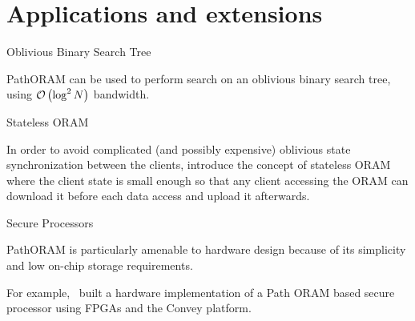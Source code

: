 
\section{Applications and extensions}

	\begin{frame}{Oblivious Binary Search Tree}
		
		PathORAM can be used to perform search on an oblivious binary search tree, using $\mathcal{O}\left(\log^2 N\right)$ bandwidth.~\cite{Gentry:2013}

	\end{frame}

	\begin{frame}{Stateless ORAM}
		
		In order to avoid complicated (and possibly expensive) oblivious state synchronization between the clients, \citeauthor{DBLP:journals/corr/abs-1105-4125} introduce the concept of stateless ORAM~\cite{DBLP:journals/corr/abs-1105-4125} where the client state is small enough so that any client accessing the ORAM can download it before each data access and upload it afterwards.

	\end{frame}

	\begin{frame}{Secure Processors}
		
		PathORAM is particularly amenable to hardware design because of its simplicity and low on-chip storage requirements.

		For example,~\textcite{Maas:EECS-2014-89} built a hardware implementation of a Path ORAM based secure processor using FPGAs and the Convey platform. %

	\end{frame}

